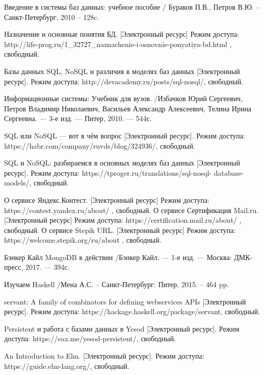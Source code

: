 
\begin{thebibliography}{9}
	  Введение в системы баз данных: учебное пособие / Бураков П.В., Петров В.Ю.  -- Санкт-Петербург, 2010 -- 128c.
	 
	  Назначение и основные понятия БД.  [Электронный ресурс] Режим доступа: http://life-prog.ru/1\_32727\_naznachenie-i-osnovnie-ponyatiya-bd.html , свободный.
	 
	  Базы данных SQL, NoSQL и различия в моделях баз данных [Электронный ресурс]. Режим доступа: http://devacademy.ru/posts/sql-nosql/, свободный.
	 
	 
	  Информационные системы: Учебник для вузов. /Избачков Юрий Сергеевич, Петров Владимир Николаевич, Васильев Александр Алексеевич, Телина Ирина Сергеевна. — 3-е изд. — Питер, 2010. — 544с.
	 
	  SQL или NoSQL — вот в чём вопрос
	 [Электронный ресурс]. Режим доступа: https://habr.com/company/ruvds/blog/324936/, свободный.
	 
	  SQL и NoSQL: разбираемся в основных моделях баз данных [Электронный ресурс]. Режим доступа: https://tproger.ru/translations/sql-nosql-
	 database-models/, свободный.
	 
	 
	  О сервисе Яндекс.Контест. [Электронный ресурс] Режим доступа: https://contest.yandex.ru/about/ , свободный.
	  О сервисе Сертификация Mail.ru. [Электронный ресурс] Режим доступа: https://certification.mail.ru/about/ , свободный.
	  О сервисе Stepik URL.  [Электронный ресурс] Режим доступа: https://welcome.stepik.org/ru/about , свободный.
	 
	  Бэнкер Кайл MongoDB в действии /Бэнкер Кайл. — 1-е изд. — Москва: ДМК-пресс, 2017. — 394с.
	 
	  Изучаем Haskell /Мена А.С. -- Санкт-Петербург: Питер, 2015. -- 464 pp.
	 
	  servant: A family of combinators for defining webservices APIs [Электронный ресурс]. Режим доступа: https://hackage.haskell.org/package/servant, свободный.
	 
	  Persistent и работа с базами данных в Yesod
	 [Электронный ресурс]. Режим доступа: https://eax.me/yesod-persistent/, свободный.
	 
	 
	  An Introduction to Elm. [Электронный ресурс]. Режим доступа: https://guide.elm-lang.org/, свободный.
	 
\end{thebibliography}